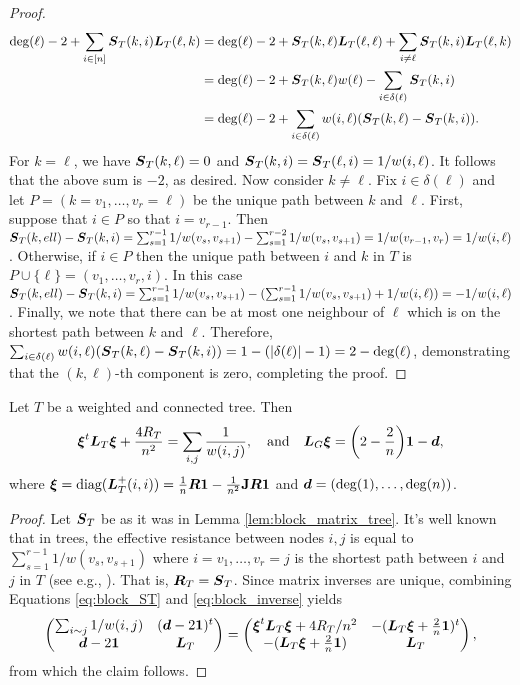 \begin{proof}
\begin{align*}
\deg(\ell) - 2 + \sum_{i\in [n]} \vb*{S}_T(k,i)\vb*{L}_T(\ell,k) &= \deg(\ell) - 2 + \vb*{S}_T(k,\ell)\vb*{L}_T(\ell,\ell) + \sum_{i\neq \ell} \vb*{S}_T(k,i)\vb*{L}_T(\ell,k)\\
&= \deg(\ell) -2 + \vb*{S}_T(k,\ell)w(\ell) - \sum_{i\in\delta(\ell)} \vb*{S}_T(k,i) \\
&= \deg(\ell) -2 + \sum_{i\in\delta(\ell)}w(i,\ell)(\vb*{S}_T(k,\ell) - \vb*{S}_T(k,i)).
\end{align*}
For $k=\ell$, we have $\vb*{S}_T(k,\ell)=0$ and $\vb*{S}_T(k,i)=\vb*{S}_T(\ell,i) = 1/w(i,\ell)$. It  follows that the above sum is $-2$, as desired. 
Now consider $k\neq \ell$. 
Fix $i\in \delta(\ell)$ and let $P=(k=v_1,\dots,v_r=\ell)$ be the unique path between $k$  and $\ell$. First, suppose that $i\in P$ so that $i=v_{r-1}$. Then $\vb*{S}_T(k,ell) - \vb*{S}_T(k,i) = \sum_{s=1}^{r-1}1/w(v_s,v_{s+1}) - \sum_{s=1}^{r-2} 1/w(v_s,v_{s+1}) = 1/w(v_{r-1},v_r) = 1/w(i,\ell)$. Otherwise,  if $i\in P$ then the unique path  between $i$ and $k$ in $T$ is $P\cup\{\ell\} = (v_1,\dots,v_r,i)$. In  this case  $\vb*{S}_T(k,ell) - \vb*{S}_T(k,i) = \sum_{s=1}^{r-1}1/w(v_s,v_{s+1}) - (\sum_{s=1}^{r-1} 1/w(v_s,v_{s+1}) + 1/w(i,\ell)) = - 1/w(i,\ell)$. Finally, we note that there can be at most one neighbour of $\ell$ which is on the shortest path between $k$ and $\ell$. Therefore, 
$\sum_{i\in\delta(\ell)}w(i,\ell)(\vb*{S}_T(k,\ell)-\vb*{S}_T(k,i)) = 1-(|\delta(\ell)|-1) = 2 - \deg(\ell)$, demonstrating that the $(k,\ell)$-th component is zero, completing the proof. 
\end{proof}

\begin{corollary}
	Let $T$  be a weighted and connected tree. Then 
	\begin{equation*}
	\vb*{\xi}^t \vb*{L}_T\vb*{\xi} + \frac{4R_T}{n^2} = \sum_{i,j}  \frac{1}{w(i,j)}, \quad \text{and}\quad \vb*{L}_G\vb*{\xi} = \bigg(2-\frac{2}{n}\bigg)\vb{1} - \vb*{d},
	\end{equation*}
	where $\vb*{\xi} = \text{diag}(\vb*{L}_T^+(i,i))=\frac{1}{n}\vb*{R}\vb{1} - \frac{1}{n^2} \vb{J} \vb*{R}\vb{1}$ and $\vb*{d}= (\deg(1),\dots,\deg(n))$. 
\end{corollary}
\begin{proof}
	Let $\vb*{S}_T$ be as it was in  Lemma \ref{lem:block_matrix_tree}. It's well known  that in trees, the effective resistance between nodes $i,j$  is equal to $\sum_{s=1}^{r-1} 1/w(v_s,v_{s+1})$ where $i=v_1,\dots,v_r=j$ is the shortest path between $i$ and $j$ in $T$ (see e.g., \cite{ellens2011effective}). That is, $\vb*{R}_T=\vb*{S}_T$. Since matrix inverses are unique, combining Equations \eqref{eq:block_ST} and \eqref{eq:block_inverse} yields 
	\begin{equation*}
	\begin{pmatrix}
	\sum_{i\sim j}1/w(i,j)  & (\vb*{d}-2\vb{1})^t \\
	\vb*{d}-2\vb{1} & \vb*{L}_T
	\end{pmatrix} = \begin{pmatrix}
\vb*{\xi}^t  \vb*{L}_T \vb*{\xi}  + 4R_T/n^2
	&  -(\vb*{L}_T\vb*{\xi} + \frac{2}{n}\vb{1} )^t \\
	-(\vb*{L}_T\vb*{\xi} + \frac{2}{n}\vb{1} ) 
	& \vb*{L}_T
	\end{pmatrix},
	\end{equation*}  
	from which the claim follows. 
\end{proof}

